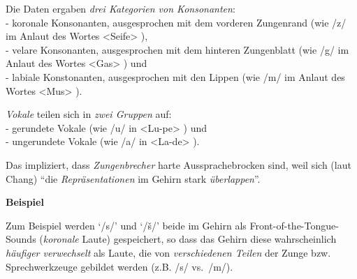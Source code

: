 \documentclass[
  letterpaper,
]{scrbook}
\begin{document}
\begin{tcolorbox}[enhanced jigsaw, colframe=quarto-callout-important-color-frame, bottomtitle=1mm, toprule=.15mm, titlerule=0mm, leftrule=.75mm, rightrule=.15mm, title=\textcolor{quarto-callout-important-color}{\faExclamation}\hspace{0.5em}{Phonemkategorien (nach Muskelbewegungen)}, colback=white, left=2mm, coltitle=black, toptitle=1mm, breakable, colbacktitle=quarto-callout-important-color!10!white, arc=.35mm, bottomrule=.15mm, opacitybacktitle=0.6, opacityback=0]

Die Daten ergaben \emph{drei Kategorien von Konsonanten}:\\
- koronale Konsonanten, ausgesprochen mit dem vorderen Zungenrand (wie
/z/ im Anlaut des Wortes \textless Seife\textgreater{} ),\\
- velare Konsonanten, ausgesprochen mit dem hinteren Zungenblatt (wie
/g/ im Anlaut des Wortes \textless Gas\textgreater{} ) und\\
- labiale Konstonanten, ausgesprochen mit den Lippen (wie /m/ im Anlaut
des Wortes \textless Mus\textgreater{} ).

\emph{Vokale} teilen sich in \emph{zwei Gruppen} auf:\\
- gerundete Vokale (wie /u/ in \textless Lu-pe\textgreater{} ) und\\
- ungerundete Vokale (wie /a/ in \textless La-de\textgreater{} ).

\end{tcolorbox}

Das impliziert, dass \emph{Zungenbrecher} harte Aussprachebrocken sind,
weil sich (laut Chang) ``die \emph{Repräsentationen} im Gehirn stark
\emph{überlappen}''.

\begin{tcolorbox}[enhanced jigsaw, colframe=quarto-callout-note-color-frame, toprule=.15mm, breakable, leftrule=.75mm, rightrule=.15mm, arc=.35mm, colback=white, left=2mm, bottomrule=.15mm, opacityback=0]
\begin{minipage}[t]{5.5mm}
\textcolor{quarto-callout-note-color}{\faInfo}
\end{minipage}%
\begin{minipage}[t]{\textwidth - 5.5mm}

\textbf{Beispiel}\vspace{2mm}

Zum Beispiel werden `/s/' und `/š/' beide im Gehirn als
Front-of-the-Tongue-Sounds (\emph{koronale} Laute) gespeichert, so dass
das Gehirn diese wahrscheinlich \emph{häufiger verwechselt} als Laute,
die von \emph{verschiedenen Teilen} der Zunge bzw. Sprechwerkzeuge
gebildet werden (z.B. /s/ vs.~/m/).

\end{minipage}%
\end{tcolorbox}
\end{document}
